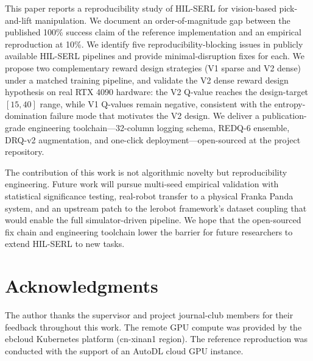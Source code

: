 \documentclass[12pt,a4paper]{article}
\begin{document}
This paper reports a reproducibility study of HIL-SERL for vision-based pick-and-lift manipulation. We document an order-of-magnitude gap between the published 100\% success claim of the reference implementation and an empirical reproduction at 10\%. We identify five reproducibility-blocking issues in publicly available HIL-SERL pipelines and provide minimal-disruption fixes for each. We propose two complementary reward design strategies (V1 sparse and V2 dense) under a matched training pipeline, and validate the V2 dense reward design hypothesis on real RTX 4090 hardware: the V2 Q-value reaches the design-target $[15, 40]$ range, while V1 Q-values remain negative, consistent with the entropy-domination failure mode that motivates the V2 design. We deliver a publication-grade engineering toolchain---32-column logging schema, REDQ-6 ensemble, DRQ-v2 augmentation, and one-click deployment---open-sourced at the project repository.

The contribution of this work is not algorithmic novelty but reproducibility engineering. Future work will pursue multi-seed empirical validation with statistical significance testing, real-robot transfer to a physical Franka Panda system, and an upstream patch to the lerobot framework's dataset coupling that would enable the full simulator-driven pipeline. We hope that the open-sourced fix chain and engineering toolchain lower the barrier for future researchers to extend HIL-SERL to new tasks.

\section*{Acknowledgments}
The author thanks the supervisor and project journal-club members for their feedback throughout this work. The remote GPU compute was provided by the ebcloud Kubernetes platform (cn-xinan1 region). The reference reproduction was conducted with the support of an AutoDL cloud GPU instance.

\renewcommand{\bibsection}{\section*{References}}
\end{document}
